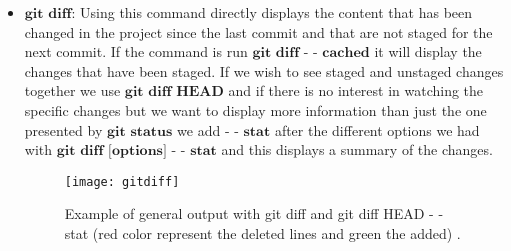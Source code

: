 \documentclass{book}
\begin{document}
\begin{itemize}
	\item $\textbf{git diff:}$ Using this command directly displays the content that has been changed in the project since the last   commit and that are not staged for the next commit. If the command is run $\textbf{git diff - - cached}$ it will display the changes that have been staged. If we wish to see staged and unstaged changes together we use $\textbf{git diff HEAD}$ and if there is no interest in watching the specific changes but we want to display more information than just the one presented by $\textbf{git status}$ we add $\textbf{- - stat}$ after the different options we had with $\textbf{git diff [options] - - stat}$ and this displays a summary of the changes.

\begin{figure}[H]
\begin{center}
	\texttt{[image: gitdiff]}

\caption{ Example of general output with git diff and git diff  HEAD - - stat (red color represent the deleted lines and green the added) .}
\label{fig:imggitdiff}
\end{center}
\end{figure}


\end{itemize}
\end{document}
